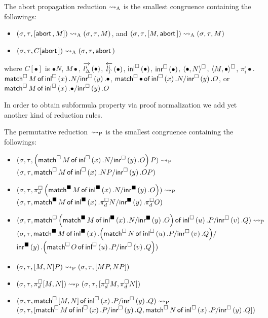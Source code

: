{\begin{definition}
 The abort propagation reduction $\areduce$ is the smallest
 congruence containing the
 followings:
\begin{itemize}
 \item  $\conf{}{}{\cotuple{\abort, M}}\areduce
 \conf{}{}{M}$, and
   $\conf{}{}{\cotuple{M,\abort}}\areduce
 \conf{}{}{M}$
 \item  $\conf{}{}{C[\abort]}\areduce
 \conf{}{}{\abort}$
\end{itemize}
 where $C[\bullet]$ is
$\bullet N$,
${M \bullet}$,
$\ltor i l \Delta \bullet$,
$\rtol i l \Gamma \bullet$,
$\sinl \bullet$,
$\sinr \bullet$,
$\spair {\bullet, N}$,
$\spair {M, \bullet}$,
$\pi^\square_i \bullet$.
$\smat M x N y \bullet$,
$\smat  \bullet x N y O$, or  \\
$\smat  M x \bullet y O$
\end{definition}
In order to obtain subformula property
 via proof normalization
we add yet another kind of reduction rules.
\begin{definition}
 The permutative reduction~$\preduce$ is the smallest congruence
 containing the followings:
\begin{itemize}
 \small
 \item $\conf{}{}{ \left(\smat  M x N y O\right) P }\preduce$ \\
       $\conf{}{}{ \smat M x {N P} y {O P} }$
 \item $\conf{}{}{ \pi^\square_d \left(\bsmat M x N y
       O\right)}\preduce$\\
       $\conf{}{}{ \bsmat M x
       {\pi^\square_d N} y {\pi^\square_d O} }$
 \item {
       $\conf{}{}{ \smat
                          {\left(\bsmat  M x N y O\right)}
                          u P v Q
                      }\preduce$ \\
       $(\lstore, \rstore,
        \mathsf{match}^{\blacksquare}\,{M}\,\mathsf{of}\, \bsinl{x}. {
                          {\left(\smat N u P v Q\right)}
       } /$ \\ \phantom{mmmmmmmmmmm}$
       \bsinr{y}. {\left(\smat  O u P v Q\right)}
                      )
       $}
 \item $\conf{}{}{ \cotuple{M, N} P }\preduce
        \conf{}{}{ \cotuple{MP, NP} }$
 \item $\conf{}{}{ \pi^\square_d\cotuple{M,N} }\preduce
        \conf{}{}{ \cotuple{\pi^\square_d M, \pi^\square_d N} }$
 \item $\conf{}{}{ \smat {\cotuple{M,N}} x P y Q }\preduce$\\
       $\conf{}{}{ \cotuple{
                          \smat  M x P y Q,
                          \smat N x P y Q
                        } }$
\end{itemize}
\end{definition}

}

